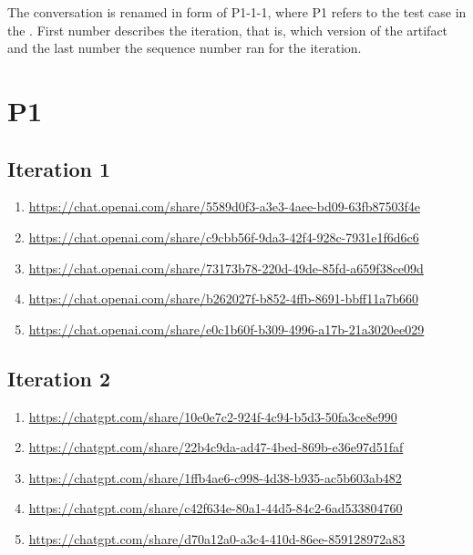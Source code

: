 

The conversation is renamed in form of P1-1-1, where P1 refers to the test case in the \textcite{act_rule_g88}. First number describes the iteration, that is, which version of the artifact and the last number the sequence number ran for the iteration.


\section{P1\label{P1-1}}

\subsection{Iteration 1}

\begin{enumerate}
    \item \href{https://chat.openai.com/share/5589d0f3-a3e3-4aee-bd09-63fb87503f4e}{https://chat.openai.com/share/5589d0f3-a3e3-4aee-bd09-63fb87503f4e}
    \item \href{https://chat.openai.com/share/c9cbb56f-9da3-42f4-928c-7931e1f6d6c6}{https://chat.openai.com/share/c9cbb56f-9da3-42f4-928c-7931e1f6d6c6}
    \item \href{https://chat.openai.com/share/73173b78-220d-49de-85fd-a659f38ce09d}{https://chat.openai.com/share/73173b78-220d-49de-85fd-a659f38ce09d}
    \item \href{https://chat.openai.com/share/b262027f-b852-4ffb-8691-bbff11a7b660}{https://chat.openai.com/share/b262027f-b852-4ffb-8691-bbff11a7b660}
    \item \href{https://chat.openai.com/share/e0c1b60f-b309-4996-a17b-21a3020ee029}{https://chat.openai.com/share/e0c1b60f-b309-4996-a17b-21a3020ee029}
\end{enumerate}

\subsection{Iteration 2}

\begin{enumerate}
    \item \href{https://chatgpt.com/share/10e0e7c2-924f-4c94-b5d3-50fa3ce8e990}{https://chatgpt.com/share/10e0e7c2-924f-4c94-b5d3-50fa3ce8e990}
    \item \href{https://chatgpt.com/share/22b4c9da-ad47-4bed-869b-e36e97d51faf}{https://chatgpt.com/share/22b4c9da-ad47-4bed-869b-e36e97d51faf}
    \item \href{https://chatgpt.com/share/1ffb4ae6-c998-4d38-b935-ac5b603ab482}{https://chatgpt.com/share/1ffb4ae6-c998-4d38-b935-ac5b603ab482}
    \item \href{https://chatgpt.com/share/c42f634e-80a1-44d5-84c2-6ad533804760}{https://chatgpt.com/share/c42f634e-80a1-44d5-84c2-6ad533804760}
    \item \href{https://chatgpt.com/share/d70a12a0-a3c4-410d-86ee-859128972a83}{https://chatgpt.com/share/d70a12a0-a3c4-410d-86ee-859128972a83}
\end{enumerate}

